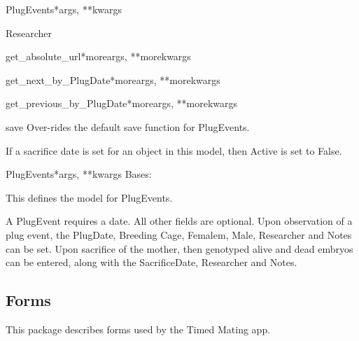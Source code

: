 \documentclass[letterpaper,10pt,english]{sphinxmanual}
\begin{document}
\begin{classdesc}{PlugEvents}{*args, **kwargs}
\hypertarget{timed\_mating.models.PlugEvents.Researcher}{}\begin{memberdesc}[PlugEvents]{Researcher}\end{memberdesc}

\hypertarget{timed\_mating.models.PlugEvents.get\_absolute\_url}{}\begin{methoddesc}[PlugEvents]{get\_absolute\_url}{*moreargs, **morekwargs}\end{methoddesc}

\hypertarget{timed\_mating.models.PlugEvents.get\_next\_by\_PlugDate}{}\begin{methoddesc}[PlugEvents]{get\_next\_by\_PlugDate}{*moreargs, **morekwargs}\end{methoddesc}

\hypertarget{timed\_mating.models.PlugEvents.get\_previous\_by\_PlugDate}{}\begin{methoddesc}[PlugEvents]{get\_previous\_by\_PlugDate}{*moreargs, **morekwargs}\end{methoddesc}

\hypertarget{timed\_mating.models.PlugEvents.save}{}\begin{methoddesc}[PlugEvents]{save}{}
Over-rides the default save function for PlugEvents.

If a sacrifice date is set for an object in this model, then Active is set to False.
\end{methoddesc}
\end{classdesc}

\begin{classdesc}{PlugEvents}{*args, **kwargs}
Bases: 

This defines the model for PlugEvents.

A PlugEvent requires a date.  All other fields are optional.
Upon observation of a plug event, the PlugDate, Breeding Cage, Femalem, Male, Researcher and Notes can be set.
Upon sacrifice of the mother, then genotyped alive and dead embryos can be entered, along with the SacrificeDate, Researcher and Notes.
\end{classdesc}


\subsection{Forms}
\hypertarget{module-timed\_mating.forms}{}
\modulesynopsis{}
This package describes forms used by the Timed Mating app.
\end{document}
